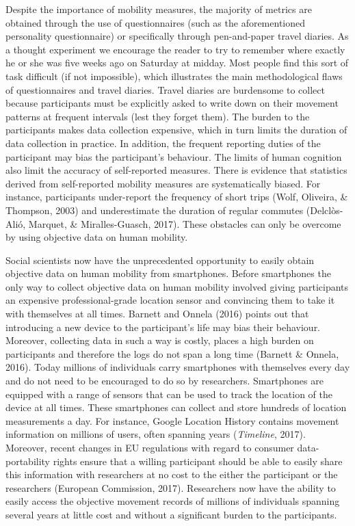 \documentclass[man]{apa6}
\theoremstyle{definition}
\theoremstyle{definition}
\theoremstyle{definition}
\theoremstyle{remark}
\begin{document}
Despite the importance of mobility measures, the majority of metrics are
obtained through the use of questionnaires (such as the aforementioned
personality questionnaire) or specifically through pen-and-paper travel
diaries. As a thought experiment we encourage the reader to try to
remember where exactly he or she was five weeks ago on Saturday at
midday. Most people find this sort of task difficult (if not
impossible), which illustrates the main methodological flaws of
questionnaires and travel diaries. Travel diaries are burdensome to
collect because participants must be explicitly asked to write down on
their movement patterns at frequent intervals (lest they forget them).
The burden to the participants makes data collection expensive, which in
turn limits the duration of data collection in practice. In addition,
the frequent reporting duties of the participant may bias the
participant's behaviour. The limits of human cognition also limit the
accuracy of self-reported measures. There is evidence that statistics
derived from self-reported mobility measures are systematically biased.
For instance, participants under-report the frequency of short trips
(Wolf, Oliveira, \& Thompson, 2003) and underestimate the duration of
regular commutes (Delclòs-Alió, Marquet, \& Miralles-Guasch, 2017).
These obstacles can only be overcome by using objective data on human
mobility.

Social scientists now have the unprecedented opportunity to easily
obtain objective data on human mobility from smartphones. Before
smartphones the only way to collect objective data on human mobility
involved giving participants an expensive professional-grade location
sensor and convincing them to take it with themselves at all times.
Barnett and Onnela (2016) points out that introducing a new device to
the participant's life may bias their behaviour. Moreover, collecting
data in such a way is costly, places a high burden on participants and
therefore the logs do not span a long time (Barnett \& Onnela, 2016).
Today millions of individuals carry smartphones with themselves every
day and do not need to be encouraged to do so by researchers.
Smartphones are equipped with a range of sensors that can be used to
track the location of the device at all times. These smartphones can
collect and store hundreds of location measurements a day. For instance,
Google Location History contains movement information on millions of
users, often spanning years (\emph{Timeline}, 2017). Moreover, recent
changes in EU regulations with regard to consumer data-portability
rights ensure that a willing participant should be able to easily share
this information with researchers at no cost to the either the
participant or the researchers (European Commission, 2017). Researchers
now have the ability to easily access the objective movement records of
millions of individuals spanning several years at little cost and
without a significant burden to the participants.
\end{document}
